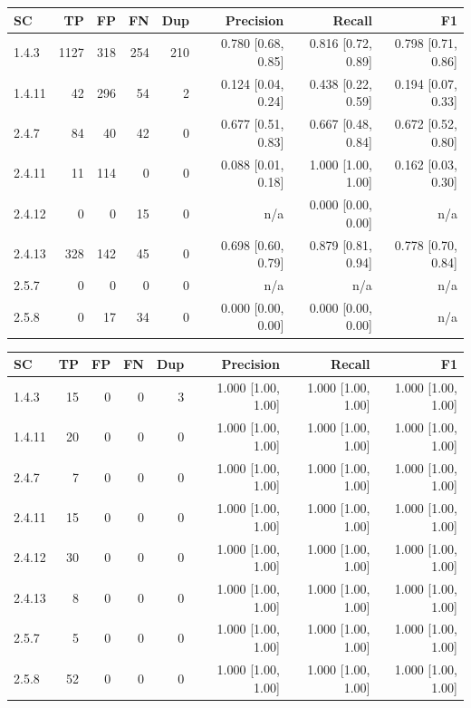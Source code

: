 \begin{tabular}{lrrrrrrr}
\hline
SC & TP & FP & FN & Dup & Precision & Recall & F1 \\
\hline
1.4.3 & 1127 & 318 & 254 & 210 & 0.780 [0.68, 0.85] & 0.816 [0.72, 0.89] & 0.798 [0.71, 0.86] \\
1.4.11 & 42 & 296 & 54 & 2 & 0.124 [0.04, 0.24] & 0.438 [0.22, 0.59] & 0.194 [0.07, 0.33] \\
2.4.7 & 84 & 40 & 42 & 0 & 0.677 [0.51, 0.83] & 0.667 [0.48, 0.84] & 0.672 [0.52, 0.80] \\
2.4.11 & 11 & 114 & 0 & 0 & 0.088 [0.01, 0.18] & 1.000 [1.00, 1.00] & 0.162 [0.03, 0.30] \\
2.4.12 & 0 & 0 & 15 & 0 & n/a & 0.000 [0.00, 0.00] & n/a \\
2.4.13 & 328 & 142 & 45 & 0 & 0.698 [0.60, 0.79] & 0.879 [0.81, 0.94] & 0.778 [0.70, 0.84] \\
2.5.7 & 0 & 0 & 0 & 0 & n/a & n/a & n/a \\
2.5.8 & 0 & 17 & 34 & 0 & 0.000 [0.00, 0.00] & 0.000 [0.00, 0.00] & n/a \\
\hline
\end{tabular}

\begin{tabular}{lrrrrrrr}
\hline
SC & TP & FP & FN & Dup & Precision & Recall & F1 \\
\hline
1.4.3 & 15 & 0 & 0 & 3 & 1.000 [1.00, 1.00] & 1.000 [1.00, 1.00] & 1.000 [1.00, 1.00] \\
1.4.11 & 20 & 0 & 0 & 0 & 1.000 [1.00, 1.00] & 1.000 [1.00, 1.00] & 1.000 [1.00, 1.00] \\
2.4.7 & 7 & 0 & 0 & 0 & 1.000 [1.00, 1.00] & 1.000 [1.00, 1.00] & 1.000 [1.00, 1.00] \\
2.4.11 & 15 & 0 & 0 & 0 & 1.000 [1.00, 1.00] & 1.000 [1.00, 1.00] & 1.000 [1.00, 1.00] \\
2.4.12 & 30 & 0 & 0 & 0 & 1.000 [1.00, 1.00] & 1.000 [1.00, 1.00] & 1.000 [1.00, 1.00] \\
2.4.13 & 8 & 0 & 0 & 0 & 1.000 [1.00, 1.00] & 1.000 [1.00, 1.00] & 1.000 [1.00, 1.00] \\
2.5.7 & 5 & 0 & 0 & 0 & 1.000 [1.00, 1.00] & 1.000 [1.00, 1.00] & 1.000 [1.00, 1.00] \\
2.5.8 & 52 & 0 & 0 & 0 & 1.000 [1.00, 1.00] & 1.000 [1.00, 1.00] & 1.000 [1.00, 1.00] \\
\hline
\end{tabular}

